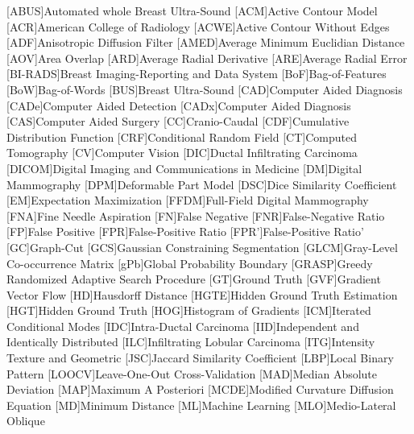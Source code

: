 \begin{acronym}[BI-RADS]
[ABUS]{Automated whole Breast Ultra-Sound}
[ACM]{Active Contour Model}
[ACR]{American College of Radiology}
[ACWE]{Active Contour Without Edges}
[ADF]{Anisotropic Diffusion Filter}
[AMED]{Average Minimum Euclidian Distance}
[AOV]{Area Overlap}
[ARD]{Average Radial Derivative}
[ARE]{Average Radial Error}
[BI-RADS]{Breast Imaging-Reporting and Data System}
[BoF]{Bag-of-Features}
[BoW]{Bag-of-Words}
[BUS]{Breast Ultra-Sound}
[CAD]{Computer Aided Diagnosis}
[CADe]{Computer Aided Detection}
[CADx]{Computer Aided Diagnosis}
[CAS]{Computer Aided Surgery}
[CC]{Cranio-Caudal}
[CDF]{Cumulative Distribution Function}
[CRF]{Conditional Random Field}
[CT]{Computed Tomography}
[CV]{Computer Vision}
[DIC]{Ductal Infiltrating Carcinoma}
[DICOM]{Digital Imaging and Communications in Medicine}
[DM]{Digital Mammography}
[DPM]{Deformable Part Model}
[DSC]{Dice Similarity Coefficient}
[EM]{Expectation Maximization}
[FFDM]{Full-Field Digital Mammography}
[FNA]{Fine Needle Aspiration}
[FN]{False Negative}
[FNR]{False-Negative Ratio}
[FP]{False Positive}
[FPR]{False-Positive Ratio}
[FPR']{False-Positive Ratio'}
[GC]{Graph-Cut}
[GCS]{Gaussian Constraining Segmentation}
[GLCM]{Gray-Level Co-occurrence Matrix}
[gPb]{Global Probability Boundary}
[GRASP]{Greedy Randomized Adaptive Search Procedure}
[GT]{Ground Truth}
[GVF]{Gradient Vector Flow}
[HD]{Hausdorff Distance}
[HGTE]{Hidden Ground Truth Estimation}
[HGT]{Hidden Ground Truth}
[HOG]{Histogram of Gradients}
[ICM]{Iterated Conditional Modes}
[IDC]{Intra-Ductal Carcinoma}
[IID]{Independent and Identically Distributed}
[ILC]{Infiltrating Lobular Carcinoma}
[ITG]{Intensity Texture and Geometric}
[JSC]{Jaccard Similarity Coefficient}
[LBP]{Local Binary Pattern}
[LOOCV]{Leave-One-Out Cross-Validation} 
[MAD]{Median Absolute Deviation}
[MAP]{Maximum A Posteriori}
[MCDE]{Modified Curvature Diffusion Equation}
[MD]{Minimum Distance}
[ML]{Machine Learning}
[MLO]{Medio-Lateral Oblique}

\end{acronym}
